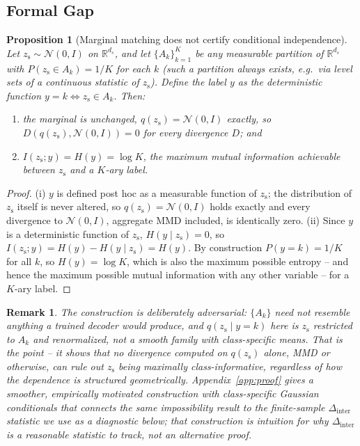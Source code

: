 \documentclass[10pt,letterpaper]{article}
\newcommand{\zs}{z_{\mathrm{s}}}
\newcommand{\R}{\mathbb{R}}
\newtheorem{proposition}{Proposition}
\newtheorem{remark}{Remark}
\begin{document}
\subsection{Formal Gap}
\label{sec:formal-gap}

\begin{proposition}[Marginal matching does not certify conditional independence]
\label{prop:marginal-not-sufficient}
Let $\zs\sim\mathcal N(0,I)$ on $\R^{d_s}$, and let $\{A_k\}_{k=1}^K$ be any
measurable partition of $\R^{d_s}$ with $P(\zs\in A_k)=1/K$ for each $k$
(such a partition always exists, e.g.\ via level sets of a continuous
statistic of $\zs$). Define the label $y$ as the deterministic function
$y=k \iff \zs\in A_k$. Then:
\begin{enumerate}[leftmargin=*,topsep=1pt,itemsep=1pt]
  \item[(i)] the marginal is unchanged, $q(\zs)=\mathcal N(0,I)$ exactly, so
        $D(q(\zs),\mathcal N(0,I))=0$ for \emph{every} divergence $D$; and
  \item[(ii)] $I(\zs;y)=H(y)=\log K$, the maximum mutual information
        achievable between $\zs$ and a $K$-ary label.
\end{enumerate}
\end{proposition}

\begin{proof}
(i) $y$ is defined post hoc as a measurable function of $\zs$; the
distribution of $\zs$ itself is never altered, so $q(\zs)=\mathcal N(0,I)$
holds exactly and every divergence to $\mathcal N(0,I)$, aggregate MMD
included, is identically zero. (ii) Since $y$ is a deterministic function of
$\zs$, $H(y\mid\zs)=0$, so $I(\zs;y)=H(y)-H(y\mid\zs)=H(y)$. By construction
$P(y=k)=1/K$ for all $k$, so $H(y)=\log K$, which is also the maximum
possible entropy -- and hence the maximum possible mutual information with
any other variable -- for a $K$-ary label.
\end{proof}

\begin{remark}
The construction is deliberately adversarial: $\{A_k\}$ need not resemble
anything a trained decoder would produce, and $q(\zs\mid y{=}k)$ here is
$\zs$ restricted to $A_k$ and renormalized, not a smooth family with
class-specific means. That is the point -- it shows that \emph{no}
divergence computed on $q(\zs)$ alone, MMD or otherwise, can rule out $\zs$
being maximally class-informative, regardless of how the dependence is
structured geometrically. Appendix~\ref{app:proof} gives a smoother,
empirically motivated construction with class-specific Gaussian
conditionals that connects the same impossibility result to the
finite-sample $\Delta_{\mathrm{inter}}$ statistic we use as a diagnostic
below; that construction is intuition for why $\Delta_{\mathrm{inter}}$ is a
reasonable statistic to track, not an alternative proof.
\end{remark}
\end{document}
